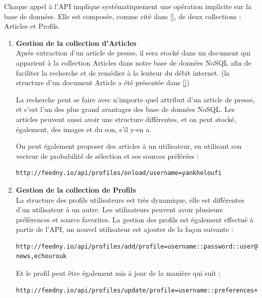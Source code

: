         Chaque appel à l'API implique systématiquement une opération implicite sur la base de données. Elle est composée, comme cité dans \autoref{}, de deux collections : Articles et Profils. 

        \begin{enumerate}[leftmargin=*]
            \item\textbf{Gestion de la collection d'Articles}\\
            Après extraction d'un article de presse, il sera stocké dans un document qui apparient à la collection Articles dans notre base de données NoSQL afin de faciliter la recherche et de remédier à la lenteur du débit internet. (la structure d'un document Article a été présentée dans \autoref{})

            La recherche peut se faire avec n'importe quel attribut d'un article de presse, et c'est l'un des plus grand avantages des base de données NoSQL. Les articles peuvent aussi avoir une structure différentes, et on peut stocké, également, des images et du son, s'il y-en a.

            On peut également proposer des articles à un utilisateur, en utilisant son vecteur de probabilité de sélection et ses sources préférées : 
\begin{lstlisting}[style=api] 
  http://feedny.io/api/profiles/onload/username=yankheloufi
\end{lstlisting} 
            
            \item\textbf{Gestion de la collection de Profils}\\
            La structure des profils utilisateurs est très dynamique, elle est différentes d'un utilisateur à un autre. Les utilisateurs peuvent avoir plusieurs préférences et source favorites. La gestion des profils est également effectué à partir de l'API, un nouvel utilisateur est ajouter de la façon suivante :   
\begin{lstlisting}[style=api] 
  http://feedny.io/api/profiles/add/profile=username::password::user@hey.com::sport,religion::bbc-news,echourouk
\end{lstlisting} 
            
            Et le profil peut être également mis à jour de la manière qui suit : 
\begin{lstlisting}[style=api] 
  http://feedny.io/api/profiles/update/profile=username::preferences+algeria
\end{lstlisting}            
        \end{enumerate} 

